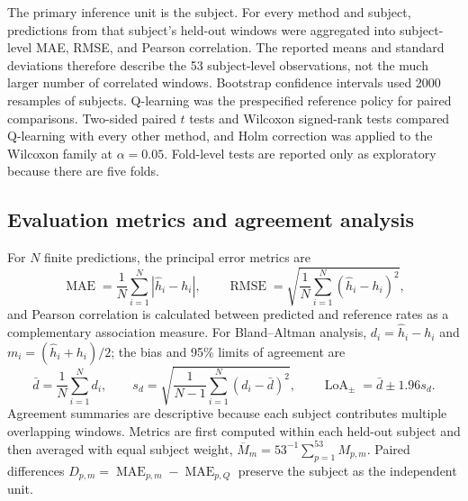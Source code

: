 \documentclass{elektr}
\begin{document}
The primary inference unit is the subject. For every method and subject, predictions from that subject's held-out windows were aggregated into subject-level MAE, RMSE, and Pearson correlation. The reported means and standard deviations therefore describe the 53 subject-level observations, not the much larger number of correlated windows. Bootstrap confidence intervals used 2000 resamples of subjects. Q-learning was the prespecified reference policy for paired comparisons. Two-sided paired $t$ tests and Wilcoxon signed-rank tests compared Q-learning with every other method, and Holm correction was applied to the Wilcoxon family at $\alpha=0.05$. Fold-level tests are reported only as exploratory because there are five folds.

\subsection{Evaluation metrics and agreement analysis}

For $N$ finite predictions, the principal error metrics are
\begin{equation}
 \operatorname{MAE}=\frac{1}{N}\sum_{i=1}^{N}|\widehat h_i-h_i|,
 \qquad
 \operatorname{RMSE}=\sqrt{\frac{1}{N}\sum_{i=1}^{N}(\widehat h_i-h_i)^2},
 \label{eq:metrics}
\end{equation}
and Pearson correlation is calculated between predicted and reference rates as a complementary association measure. For Bland--Altman analysis, $d_i=\widehat h_i-h_i$ and $m_i=(\widehat h_i+h_i)/2$; the bias and 95\% limits of agreement are
\begin{equation}
 \bar d=\frac{1}{N}\sum_{i=1}^{N}d_i,\qquad
 s_d=\sqrt{\frac{1}{N-1}\sum_{i=1}^{N}(d_i-\bar d)^2},\qquad
 \operatorname{LoA}_{\pm}=\bar d\pm1.96s_d.
 \label{eq:loa}
\end{equation}
Agreement summaries are descriptive because each subject contributes multiple overlapping windows. Metrics are first computed within each held-out subject and then averaged with equal subject weight, $\overline M_m=53^{-1}\sum_{p=1}^{53}M_{p,m}$. Paired differences $D_{p,m}=\operatorname{MAE}_{p,m}-\operatorname{MAE}_{p,Q}$ preserve the subject as the independent unit.
\end{document}
